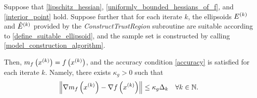 \documentclass{article}
\begin{document}
\begin{theorem}
\label{linear_accuracy_is_satisfied}

Suppose that \cref{lipschitz_hessian}, \cref{uniformly_bounded_hessians_of_f}, and \cref{interior_point} hold.
Suppose further that for each iterate $k$, the ellipsoids ${E^{(k)}}$ and ${{\hat E}^{(k)}}$ provided by the \emph{ConstructTrustRegion} subroutine 
are suitable according to \cref{define_suitable_ellipsoid},
and the sample set is constructed by calling \cref{model_construction_algorithm}.



Then, $m_f\left(x^{(k)}\right) = f\left(x^{(k)}\right)$, and
the accuracy condition \cref{accuracy} is satisfied for each iterate $k$.
Namely, there exists $\kappa_{g} > 0$ such that 
\begin{align*}
\left\|\nabla m_f\left(x^{(k)}\right) - \nabla f\left(x^{(k)}\right)\right\| \le \kappa_g \Delta_k \quad \forall k \in \mathbb N.
\end{align*}
\end{theorem}
\end{document}
